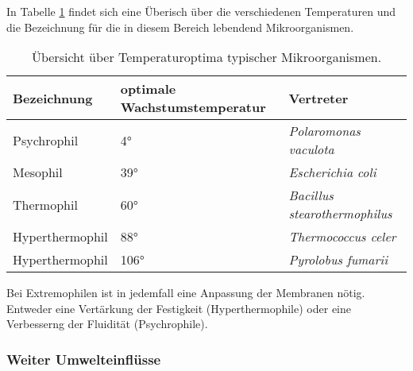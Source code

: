 In Tabelle \ref{tab:tempGruppen} findet sich eine Überisch über die verschiedenen Temperaturen
und die Bezeichnung für die in diesem Bereich lebendend Mikroorganismen.

\begin{table}
	\centering
	\begin{tabular}{l l l}
		\toprule
		Bezeichnung		& optimale Wachstumstemperatur	& Vertreter \\
		\midrule
		Psychrophil		&	4°		&\emph{Polaromonas vaculota}\\
		Mesophil			&	39°	&\emph{Escherichia coli}\\    
		Thermophil		&	60°	&\emph{Bacillus stearothermophilus}\\
		Hyperthermophil&	88°	&\emph{Thermococcus celer}\\  
		Hyperthermophil&	106°	&\emph{Pyrolobus fumarii}\\   
		\bottomrule
	\end{tabular}
	\caption{Übersicht über Temperaturoptima typischer Mikroorganismen.}
	\label{tab:tempGruppen}
\end{table}

Bei Extremophilen ist in jedemfall eine Anpassung der Membranen nötig.
Entweder eine Vertärkung der Festigkeit (Hyperthermophile)
oder eine Verbesserng der Fluidität (Psychrophile).

\subsubsection*{Weiter Umwelteinflüsse}

